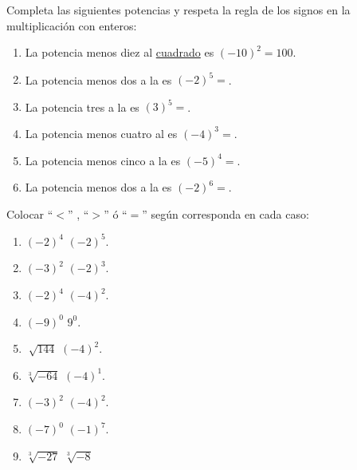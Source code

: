 \documentclass[12pt]{examdesign}
\theoremstyle{plain}
\theoremstyle{definition}
\theoremstyle{remark}
\begin{document}
	\begin{fillin}[title={Leemos el material de consulta y realizamos las actividades propuestas}]
		
		\begin{question}
			Completa las siguientes potencias y respeta la regla de los signos en la multiplicación con enteros:
			\begin{enumerate}
				\item La potencia menos diez al \underline{cuadrado} es $(-10)^{2}=$\underline{$100$}.
				\item La potencia menos dos a la  es $(-2)^{5}=$.
				\item La potencia tres a la  es $(3)^{5}=$.
				\item La potencia menos cuatro al  es $(-4)^{3}=$.
				\item La potencia menos cinco a la  es $(-5)^{4}=$.
				\item La potencia menos dos a la  es $(-2)^{6}=$.
			\end{enumerate}
		\end{question}
	    \begin{question}
	    	Colocar ``$<$'' , ``$>$'' ó ``$=$'' según corresponda en cada caso:
	    	\begin{enumerate}
	    		\item $(-2)^4$ \blank{ $>$ } $(-2)^{5}$.
	    		\item $(-3)^2$ \blank{ $>$ } $(-2)^{3}$.
	    		\item $(-2)^4$ \blank{ $=$ } $(-4)^{2}$.
	    		\item $(-9)^0$ \blank{ $>$ } $9^{0}$.
	    		\item $\sqrt[]{144}$ \blank{ $<$ } $(-4)^{2}$.
	    		\item $\sqrt[3]{-64}$ \blank{ $=$ } $(-4)^{1}$.
	    		\item $(-3)^{2}$ \blank{ $<$ } $(-4)^{2}$.
	    		\item $(-7)^0$ \blank{ $>$ } $(-1)^{7}$.
	    		\item $\sqrt[3]{-27}$ \blank{ $<$ } $\sqrt[3]{-8}$
	    	\end{enumerate}
	    \end{question}
    \end{fillin}
\end{document}

